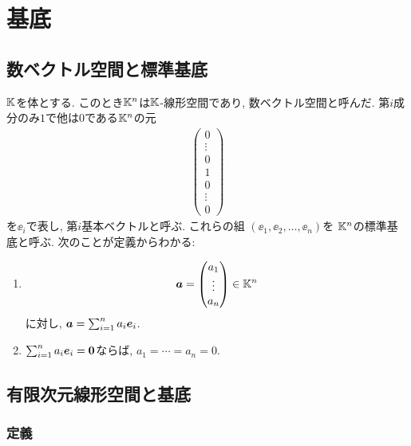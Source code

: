 \begin{quiz}
\end{quiz}


\chapter{基底}
\section{数ベクトル空間と標準基底}
$\mathbb{K}$を体とする.
このとき$\mathbb{K}^n$は$\mathbb{K}$-線形空間であり,
数ベクトル空間と呼んだ.
第$i$成分のみ$1$で他は$0$である$\mathbb{K}^n$の元
\begin{align*}
  \begin{pmatrix}0\\\vdots\\0\\1\\0\\\vdots\\0\end{pmatrix}
\end{align*}
を$\ee_i$で表し,
第$i$基本ベクトルと呼ぶ.
これらの組 $(\ee_1,\ee_2,\ldots,\ee_n)$を
$\mathbb{K}^n$の標準基底と呼ぶ.
次のことが定義からわかる:
\begin{enumerate}
\item
    \begin{align*}
      \boldsymbol{a}=\begin{pmatrix}a_1\\\vdots\\a_n\end{pmatrix}\in\mathbb{K}^n
    \end{align*}
    に対し, $\boldsymbol{a}=\sum_{i=1}^na_i\boldsymbol{e}_i$.
  \item
    $\sum_{i=1}^na_i\boldsymbol{e}_i=\boldsymbol{0}$ならば, $a_1=\cdots=a_n=0$.
\end{enumerate}
\section{有限次元線形空間と基底}
\subsection{定義}


